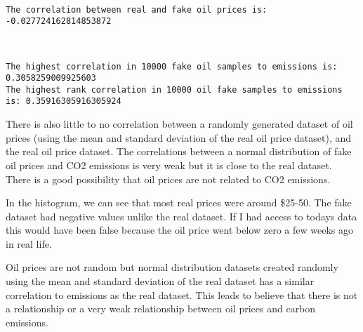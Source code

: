 \documentclass[11pt]{article}
\begin{document}
    \begin{center}
    \end{center}
    { \hspace*{\fill} \\}
    
    \begin{Verbatim}[commandchars=\\\{\}]
The correlation between real and fake oil prices is: -0.027724162814853872

    \end{Verbatim}

    \begin{center}
    \end{center}
    { \hspace*{\fill} \\}
    
    \begin{Verbatim}[commandchars=\\\{\}]
The highest correlation in 10000 fake oil samples to emissions is: 0.3058259009925603
The highest rank correlation in 10000 oil fake samples to emissions is: 0.35916305916305924

    \end{Verbatim}

    There is also little to no correlation between a randomly generated
dataset of oil prices (using the mean and standard deviation of the real
oil price dataset), and the real oil price dataset. The correlations
between a normal distribution of fake oil prices and CO2 emissions is
very weak but it is close to the real dataset. There is a good
possibility that oil prices are not related to CO2 emissions.

In the histogram, we can see that most real prices were around \$25-50.
The fake dataset had negative values unlike the real dataset. If I had
access to todays data this would have been false because the oil price
went below zero a few weeks ago in real life.

Oil prices are not random but normal distribution datasets created
randomly using the mean and standard deviation of the real dataset has a
similar correlation to emissions as the real dataset. This leads to
believe that there is not a relationship or a very weak relationship
between oil prices and carbon emissions.
\end{document}
